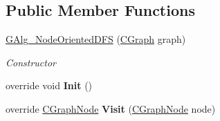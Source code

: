 \subsection*{Public Member Functions}
\begin{DoxyCompactItemize}
\item 
\hyperlink{class_graph_library_1_1_aglorithms_1_1_g_alg___node_oriented_d_f_s_a08a0b177dee71f014d5d2dfe929bae6c}{G\+Alg\+\_\+\+Node\+Oriented\+D\+F\+S} (\hyperlink{class_graph_library_1_1_c_graph}{C\+Graph} graph)
\begin{DoxyCompactList}\small\item\em Constructor \end{DoxyCompactList}\item 
\hypertarget{class_graph_library_1_1_aglorithms_1_1_g_alg___node_oriented_d_f_s_a67e72af02594968bea2c7c140bf55f4a}{}override void {\bfseries Init} ()\label{class_graph_library_1_1_aglorithms_1_1_g_alg___node_oriented_d_f_s_a67e72af02594968bea2c7c140bf55f4a}

\item 
\hypertarget{class_graph_library_1_1_aglorithms_1_1_g_alg___node_oriented_d_f_s_a27528338adca82162cdf706c70ddde42}{}override \hyperlink{class_graph_library_1_1_c_graph_node}{C\+Graph\+Node} {\bfseries Visit} (\hyperlink{class_graph_library_1_1_c_graph_node}{C\+Graph\+Node} node)\label{class_graph_library_1_1_aglorithms_1_1_g_alg___node_oriented_d_f_s_a27528338adca82162cdf706c70ddde42}


\end{DoxyCompactItemize}
